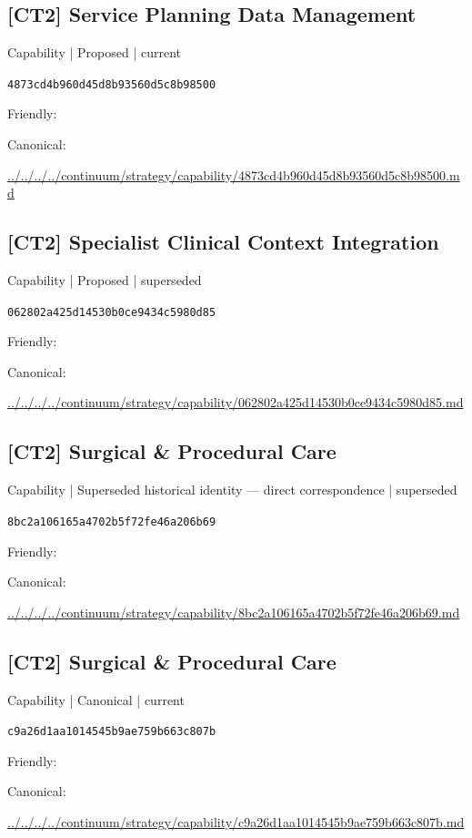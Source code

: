 \documentclass[10pt,a4paper]{article}
\begin{document}
\subsection*{[CT2] Service Planning Data Management}
{\small Capability | Proposed | current}\par
\texttt{4873cd4b960d45d8b93560d5c8b98500}\par
Friendly: \par
Canonical: \par
{\footnotesize\url{../../../../continuum/strategy/capability/4873cd4b960d45d8b93560d5c8b98500.md}}\par
\subsection*{[CT2] Specialist Clinical Context Integration}
{\small Capability | Proposed | superseded}\par
\texttt{062802a425d14530b0ce9434c5980d85}\par
Friendly: \par
Canonical: \par
{\footnotesize\url{../../../../continuum/strategy/capability/062802a425d14530b0ce9434c5980d85.md}}\par
\subsection*{[CT2] Surgical \& Procedural Care}
{\small Capability | Superseded historical identity — direct correspondence | superseded}\par
\texttt{8bc2a106165a4702b5f72fe46a206b69}\par
Friendly: \par
Canonical: \par
{\footnotesize\url{../../../../continuum/strategy/capability/8bc2a106165a4702b5f72fe46a206b69.md}}\par
\subsection*{[CT2] Surgical \& Procedural Care}
{\small Capability | Canonical | current}\par
\texttt{c9a26d1aa1014545b9ae759b663c807b}\par
Friendly: \par
Canonical: \par
{\footnotesize\url{../../../../continuum/strategy/capability/c9a26d1aa1014545b9ae759b663c807b.md}}\par
\end{document}

